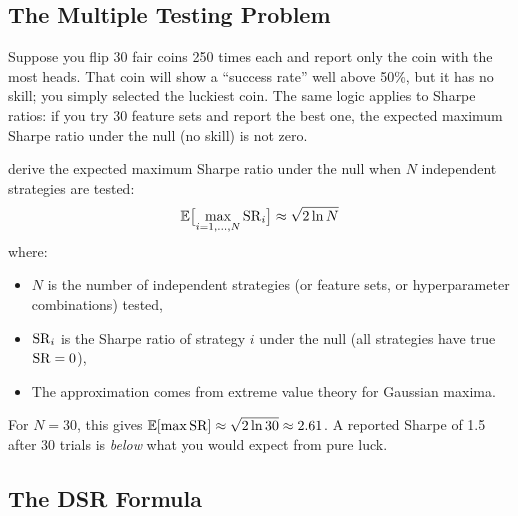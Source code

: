 \subsection{The Multiple Testing Problem}

\begin{intuition}
Suppose you flip 30 fair coins 250 times each and report only the coin with the most heads.
That coin will show a ``success rate'' well above 50\%, but it has no skill; you simply selected the luckiest coin.
The same logic applies to Sharpe ratios: if you try 30 feature sets and report the best one, the expected maximum Sharpe ratio under the null (no skill) is not zero.
\end{intuition}

\citet{Bailey2014DSR} derive the expected maximum Sharpe ratio under the null when $N$ independent strategies are tested:
\begin{equation}
\label{eq:expected-max-sr}
\mathbb{E}\bigl[\max_{i=1,\ldots,N} \operatorname{SR}_i\bigr] \approx \sqrt{2 \ln N}
\end{equation}
where:
\begin{itemize}[nosep]
  \item $N$ is the number of independent strategies (or feature sets, or hyperparameter combinations) tested,
  \item $\operatorname{SR}_i$ is the Sharpe ratio of strategy $i$ under the null (all strategies have true $\operatorname{SR} = 0$),
  \item The approximation comes from extreme value theory for Gaussian maxima.
\end{itemize}

For $N = 30$, this gives $\mathbb{E}[\max \operatorname{SR}] \approx \sqrt{2 \ln 30} \approx 2.61$.
A reported Sharpe of 1.5 after 30 trials is \emph{below} what you would expect from pure luck.

\subsection{The DSR Formula}

